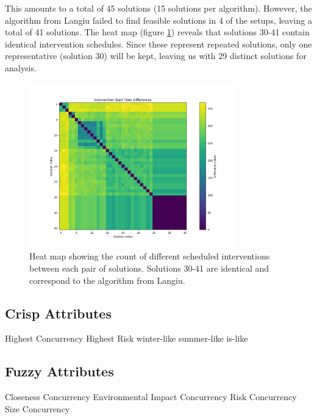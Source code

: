 This amounts to a total of 45 solutions (15 solutions per algorithm). However, the algorithm from Langiu failed to find feasible solutions in 4 of the setups, leaving a total of 41 solutions. The heat map (figure \ref{fig:dif_sol}) reveals that solutions 30-41 contain identical intervention schedules. Since these represent repeated solutions, only one representative (solution 30) will be kept, leaving us with 29 distinct solutions for analysis.

\begin{figure}[ht]
    \centering
    \includegraphics[width=0.8\textwidth]{ch3/figures/diff_sol.png}
    \caption{Heat map showing the count of different scheduled interventions between each pair of solutions. Solutions 30-41 are identical and correspond to the algorithm from Langiu.}
    \label{fig:dif_sol}
\end{figure}









\subsection{Crisp Attributes}
Highest Concurrency
Highest Risk %
winter-like
summer-like
is-like

\subsection{Fuzzy Attributes}
Closeness Concurrency
Environmental Impact Concurrency
Risk Concurrency %
Size Concurrency %
